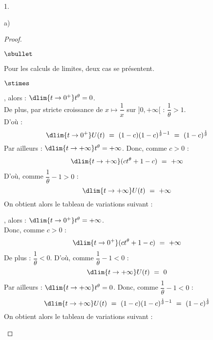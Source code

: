 \documentclass[11pt]{article}%
\begin{document}
\begin{noliste}{1.}
\begin{noliste}{a)}
\begin{proof}
\begin{noliste}{$\sbullet$}
    \item Pour les calculs de limites, deux cas se présentent.
    \begin{noliste}{$\stimes$}
      \item {}, alors :
      $\dlim{t\to 0^+} t^\theta = 0$. \\
      De plus, par stricte 
      croissance de $x\mapsto \dfrac{1}{x}$ sur $]0,+\infty[$ :
      $
       \dfrac{1}{\theta} >1
      $.\\[.2cm]
      D'où :
      \[
       \dlim{t\to 0^+} U(t) \ = \ (1-c)(1-c)^{\frac{1}{\theta}-1}
       \ = \ (1-c)^{\frac{1}{\theta}}
      \]
      Par ailleurs : $\dlim{t\to +\infty} t^\theta = +\infty$. 
      Donc, comme $c>0$ :
      \[
       \dlim{t\to +\infty} (ct^\theta +1-c) \ = \ +\infty
      \]
      D'où, comme $\dfrac{1}{\theta}-1>0$ :
      \[
       \dlim{t\to +\infty} U(t) \ = \ +\infty
      \]
      On obtient alors le tableau de variations suivant :
      
      \begin{center}
     \end{center}
     
     \item {}, alors :
      $\dlim{t\to 0^+} t^\theta = +\infty$. \\
      Donc, comme $c>0$ :
      \[
       \dlim{t\to 0^+} (ct^\theta +1-c) \ = \ +\infty
      \]
      De plus : $\dfrac{1}{\theta}<0$.
      D'où, comme $\dfrac{1}{\theta}-1<0$ :
      \[
       \dlim{t\to +\infty} U(t) \ = \ 0
      \]
      Par ailleurs : $\dlim{t\to +\infty} t^\theta = 0$. 
      Donc, comme $\dfrac{1}{\theta}-1<0$ :
      \[
       \dlim{t\to +\infty} U(t) \ = \ (1-c)(1-c)^{\frac{1}{\theta}-1}
       \ = \ (1-c)^{\frac{1}{\theta}}
      \]
      On obtient alors le tableau de variations suivant :
      
      \begin{center}
     \end{center}
     

\end{noliste}
\end{noliste}
\end{proof}
\end{noliste}
\end{noliste}
\end{document}
